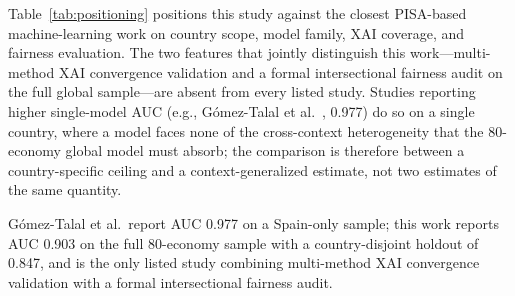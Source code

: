 \documentclass[journal]{IEEEtran}
\begin{document}
Table~\ref{tab:positioning} positions this study against the closest PISA-based machine-learning work on country scope, model family, XAI coverage, and fairness evaluation. The two features that jointly distinguish this work---multi-method XAI convergence validation and a formal intersectional fairness audit on the full global sample---are absent from every listed study. Studies reporting higher single-model AUC (e.g., G\'omez-Talal et al.~\cite{Gomez_Talal_2025}, 0.977) do so on a single country, where a model faces none of the cross-context heterogeneity that the 80-economy global model must absorb; the comparison is therefore between a country-specific ceiling and a context-generalized estimate, not two estimates of the same quantity.

\begin{table}[!t]
\centering
\caption{Positioning of This Study Against Closest PISA-Based Machine-Learning Work}
\label{tab:positioning}
\footnotesize
{}
\vspace{2pt}
{\footnotesize G\'omez-Talal et al.\ report AUC 0.977 on a Spain-only sample; this work reports AUC 0.903 on the full 80-economy sample with a country-disjoint holdout of 0.847, and is the only listed study combining multi-method XAI convergence validation with a formal intersectional fairness audit.}
\end{table}
\end{document}
